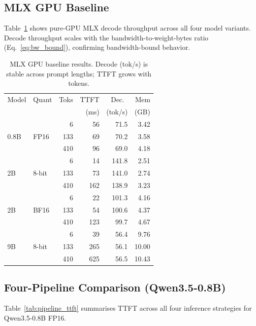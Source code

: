 \documentclass[11pt]{article}
\begin{document}
\subsection{MLX GPU Baseline}

Table~\ref{tab:mlx_baseline} shows pure-GPU MLX decode throughput across
all four model variants.
Decode throughput scales with the bandwidth-to-weight-bytes ratio
(Eq.~\ref{eq:bw_bound}), confirming bandwidth-bound behavior.

\begin{table}[h]
\centering
\small
\begin{tabular}{@{}llrrrr@{}}
\toprule
Model & Quant & Toks & TTFT & Dec.\ & Mem \\
 & & & (ms) & (tok/s) & (GB) \\
\midrule
\multirow{3}{*}{0.8B} & \multirow{3}{*}{FP16}
  & 6 & 56 & 71.5 & 3.42 \\
  & & 133 & 69 & 70.2 & 3.58 \\
  & & 410 & 96 & 69.0 & 4.18 \\
\midrule
\multirow{3}{*}{2B} & \multirow{3}{*}{8-bit}
  & 6 & 14 & 141.8 & 2.51 \\
  & & 133 & 73 & 141.0 & 2.74 \\
  & & 410 & 162 & 138.9 & 3.23 \\
\midrule
\multirow{3}{*}{2B} & \multirow{3}{*}{BF16}
  & 6 & 22 & 101.3 & 4.16 \\
  & & 133 & 54 & 100.6 & 4.37 \\
  & & 410 & 123 & 99.7 & 4.67 \\
\midrule
\multirow{3}{*}{9B} & \multirow{3}{*}{8-bit}
  & 6 & 39 & 56.4 & 9.76 \\
  & & 133 & 265 & 56.1 & 10.00 \\
  & & 410 & 625 & 56.5 & 10.43 \\
\bottomrule
\end{tabular}
\caption{MLX GPU baseline results. Decode (tok/s) is stable across
  prompt lengths; TTFT grows with tokens.}
\label{tab:mlx_baseline}
\end{table}

\subsection{Four-Pipeline Comparison (Qwen3.5-0.8B)}

Table~\ref{tab:pipeline_ttft} summarises TTFT across all four inference
strategies for Qwen3.5-0.8B FP16.
\end{document}
